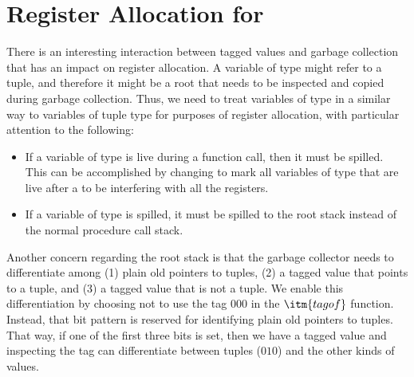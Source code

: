 \documentclass[7x10]{TimesAPriori_MIT}%
\def\racketEd{0}
\def\pythonEd{1}
\def\edition{1}
\newcommand{\racket}[1]{{\if\edition\racketEd{#1}\fi}}
\newcommand{\pythonColor}[0]{}
\newcommand{\python}[1]{{\if\edition\pythonEd\pythonColor #1\fi}}
\newtheorem{exercise}[theorem]{Exercise}
\numberwithin{theorem}{chapter}
\numberwithin{definition}{chapter}
\numberwithin{equation}{chapter}
\begin{document}



\section{Register Allocation for \LangAny{}}
\label{sec:register-allocation-Lany}

There is an interesting interaction between tagged values and garbage
collection that has an impact on register allocation.  A variable of
type \ANYTY{} might refer to a tuple, and therefore it might be a root
that needs to be inspected and copied during garbage collection. Thus,
we need to treat variables of type \ANYTY{} in a similar way to
variables of tuple type for purposes of register allocation,
with particular attention to the following:
\begin{itemize}
\item If a variable of type \ANYTY{} is live during a function call,
  then it must be spilled. This can be accomplished by changing
   to mark all variables of type \ANYTY{}
  that are live after a  to be interfering with all the
  registers.

\item If a variable of type \ANYTY{} is spilled, it must be spilled to
  the root stack instead of the normal procedure call stack.
\end{itemize}

Another concern regarding the root stack is that the garbage collector
needs to differentiate among (1) plain old pointers to tuples, (2) a
tagged value that points to a tuple, and (3) a tagged value that is
not a tuple. We enable this differentiation by choosing not to use the
tag $000$ in the $\itm{tagof}$ function. Instead, that bit pattern is
reserved for identifying plain old pointers to tuples. That way, if
one of the first three bits is set, then we have a tagged value and
inspecting the tag can differentiate between tuples ($010$) and the
other kinds of values.

\end{document}
